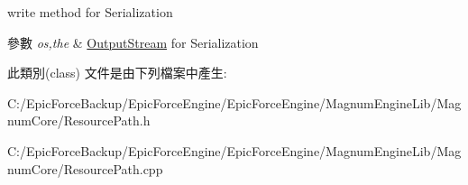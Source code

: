 write method for Serialization 


\begin{DoxyParams}{參數}
{\em os,the} & \hyperlink{class_magnum_1_1_output_stream}{Output\+Stream} for Serialization \\
\hline
\end{DoxyParams}


此類別(class) 文件是由下列檔案中產生\+:\begin{DoxyCompactItemize}
\item 
C\+:/\+Epic\+Force\+Backup/\+Epic\+Force\+Engine/\+Epic\+Force\+Engine/\+Magnum\+Engine\+Lib/\+Magnum\+Core/Resource\+Path.\+h\item 
C\+:/\+Epic\+Force\+Backup/\+Epic\+Force\+Engine/\+Epic\+Force\+Engine/\+Magnum\+Engine\+Lib/\+Magnum\+Core/Resource\+Path.\+cpp\end{DoxyCompactItemize}

